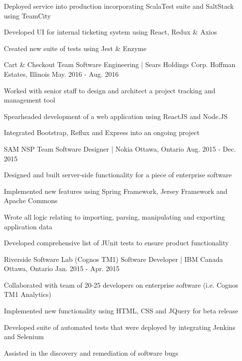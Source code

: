 \begin{cventries}
{\begin{cvitems}
        \item {Deployed service into production incorporating ScalaTest suite and SaltStack using TeamCity}
        \item {Developed UI for internal ticketing system using React, Redux \& Axios}
        \item {Created new suite of tests using Jest \& Enzyme}
      \end{cvitems}
    }
    \cventry
    {Cart \& Checkout Team}
    {Software Engineering | Sears Holdings Corp.}
    {Hoffman Estates, Illinois}
    {May. 2016 - Aug. 2016}
    {
      \begin{cvitems}
        \item {Worked with senior staff to design and architect a project tracking and management tool}
       \item {Spearheaded development of a web application using ReactJS and Node.JS}
        \item {Integrated Bootstrap, Reflux and Express into an ongoing project}
      \end{cvitems}
    }
  \cventry
    {SAM NSP Team}
    {Software Designer | Nokia}
    {Ottawa, Ontario}
    {Aug. 2015 - Dec. 2015}
    {
      \begin{cvitems}
        \item {Designed and built server-side functionality for a piece of enterprise software}
        \item {Implemented new features using Spring Framework, Jersey Framework and Apache Commons}
        \item {Wrote all logic relating to importing, parsing, manipulating and exporting application data}
        \item {Developed comprehensive list of JUnit tests to ensure product functionality}
      \end{cvitems}
    }
  \cventry
    {Riverside Software Lab (Cognos TM1)}
    {Software Developer | IBM Canada}
    {Ottawa, Ontario}
    {Jan. 2015 - Apr. 2015}
    {
      \begin{cvitems}
        \item {Collaborated with team of 20-25 developers on enterprise software (i.e. Cognos TM1 Analytics)}
        \item {Implemented new functionality using HTML, CSS and JQuery for beta release}
        \item {Developed suite of automated tests that were deployed by integrating Jenkins and Selenium}
        \item {Assisted in the discovery and remediation of software bugs}

\end{cvitems}}
\end{cventries}

